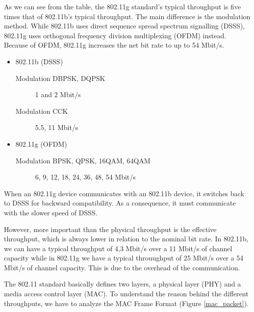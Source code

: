 	As we can see from the table, the 802.11g standard's typical throughput is five times that of 802.11b's typical throughput.  The main difference is the modulation method.  While 802.11b uses direct sequence spread spectrum signalling (DSSS), 802.11g uses orthogonal frequency division multiplexing (OFDM) instead.  Because of OFDM, 802.11g increases the net bit rate to up to 54 Mbit/s.
	
	\begin{itemize}
		\item 802.11b (DSSS)
			\begin{description}
				\item[Modulation DBPSK, DQPSK] 1 and 2 Mbit/s
				\item[Modulation CCK] 5.5, 11 Mbit/s
			\end{description}
		\item 802.11g (OFDM)
			\begin{description}
				\item[Modulation BPSK, QPSK, 16QAM, 64QAM] 6, 9, 12, 18, 24, 36, 48, 54 Mbit/s
			\end{description}
	\end{itemize}
%
	When an 802.11g device communicates with an 802.11b device, it switches back to DSSS for backward compatibility. As a consequence, it must communicate with the slower speed of DSSS.

	However, more important than the physical throughput is the effective throughput, which is always lower in relation to the nominal bit rate.
	In 802.11b, we can have a typical throughput of 4,3 Mbit/s over a 11 Mbit/s of channel capacity while in 802.11g we have a typical throuughput of 25 Mbit/s over a 54 Mbit/s of channel capacity. This is due to the overhead of the communication.
	
	The 802.11 standard basically defines two layers, a physical layer (PHY) and a media access control layer (MAC). To understand the reason behind the different throughputs, we have to analyze the MAC Frame Format (Figure \ref{mac_packet}).
	
